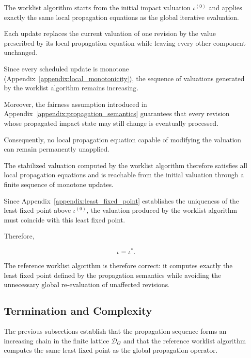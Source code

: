 \documentclass[10pt]{article}
\begin{document}
The worklist algorithm starts from the initial impact valuation
$\iota^{(0)}$
and applies exactly the same local propagation equations as the global
iterative evaluation.

Each update replaces the current valuation of one revision by the value
prescribed by its local propagation equation while leaving every other
component unchanged.

Since every scheduled update is monotone
(Appendix~\ref{appendix:local_monotonicity}),
the sequence of valuations generated by the worklist algorithm remains
increasing.

Moreover, the fairness assumption introduced in
Appendix~\ref{appendix:propagation_semantics}
guarantees that every revision whose propagated impact state may still change
is eventually processed.

Consequently, no local propagation equation capable of modifying the valuation
can remain permanently unapplied.

The stabilized valuation computed by the worklist algorithm therefore satisfies
all local propagation equations and is reachable from the initial valuation
through a finite sequence of monotone updates.

Since Appendix~\ref{appendix:least_fixed_point}
establishes the uniqueness of the least fixed point above
$\iota^{(0)}$,
the valuation produced by the worklist algorithm must coincide with this least
fixed point.

Therefore,

\begin{equation}
	\label{eq:worklist_correctness}
	\iota
	=
	\iota^{*}.
\end{equation}

The reference worklist algorithm is therefore correct: it computes exactly the
least fixed point defined by the propagation semantics while avoiding the
unnecessary global re-evaluation of unaffected revisions.

\subsection{Termination and Complexity}

The previous subsections establish that the propagation sequence forms an
increasing chain in the finite lattice
$\mathcal D_G$
and that the reference worklist algorithm computes the same least fixed point
as the global propagation operator.
\end{document}
